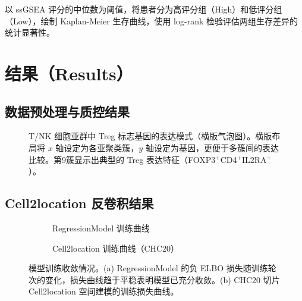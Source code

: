 \documentclass[12pt, a4paper]{ctexart}
\begin{document}
以 ssGSEA 评分的中位数为阈值，将患者分为高评分组（High）和低评分组（Low），绘制 Kaplan-Meier 生存曲线，使用 log-rank 检验评估两组生存差异的统计显著性。

\section{结果（Results）}

\subsection{数据预处理与质控结果}

\begin{figure}[H]
\centering
\caption{T/NK 细胞亚群中 Treg 标志基因的表达模式（横版气泡图）。横版布局将 $x$ 轴设定为各亚聚类簇，$y$ 轴设定为基因，更便于多簇间的表达比较。第9簇显示出典型的 Treg 表达特征（FOXP3$^+$CD4$^+$IL2RA$^+$）。}
\label{fig:treg_dotplot}
\end{figure}

\subsection{Cell2location 反卷积结果}

\begin{figure}[H]
\centering
\begin{subfigure}[b]{0.48\textwidth}
\caption{RegressionModel 训练曲线}
\end{subfigure}
\hfill
\begin{subfigure}[b]{0.48\textwidth}
\caption{Cell2location 训练曲线（CHC20）}
\end{subfigure}
\caption{模型训练收敛情况。(a) RegressionModel 的负 ELBO 损失随训练轮次的变化，损失曲线趋于平稳表明模型已充分收敛。(b) CHC20 切片 Cell2location 空间建模的训练损失曲线。}
\label{fig:training_history}
\end{figure}
\end{document}
